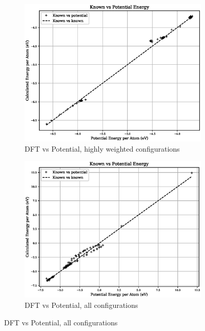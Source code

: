 \begin{figure}[htb]
\begin{subfigure}{.42\textwidth}
  \centering
  \includegraphics[width=.94\linewidth]{chapters/potentials_fe_pd_ru/feru_potential/potential_known_energy_fit_set.eps}  
  \caption{DFT vs Potential, highly weighted configurations}
  \label{fig:feru-energy-fit}
\end{subfigure}
\begin{subfigure}{.42\textwidth}
  \centering
  \includegraphics[width=.94\linewidth]{chapters/potentials_fe_pd_ru/feru_potential/potential_known_energy_full_set.eps}  
  \caption{DFT vs Potential, all configurations}
  \label{fig:feru-energy-full}
\end{subfigure}
\label{fig:feru-energy-fit}
\end{figure}

